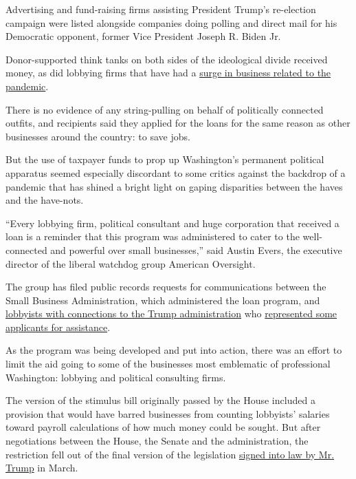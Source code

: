 Advertising and fund-raising firms assisting President Trump's
re-election campaign were listed alongside companies doing polling and
direct mail for his Democratic opponent, former Vice President Joseph R.
Biden Jr.

Donor-supported think tanks on both sides of the ideological divide
received money, as did lobbying firms that have had a
\href{https://www.nytimes.com/2020/03/20/us/politics/coronavirus-stimulus-lobbying.html}{surge
in business related to the pandemic}.

There is no evidence of any string-pulling on behalf of politically
connected outfits, and recipients said they applied for the loans for
the same reason as other businesses around the country: to save jobs.

But the use of taxpayer funds to prop up Washington's permanent
political apparatus seemed especially discordant to some critics against
the backdrop of a pandemic that has shined a bright light on gaping
disparities between the haves and the have-nots.

``Every lobbying firm, political consultant and huge corporation that
received a loan is a reminder that this program was administered to
cater to the well-connected and powerful over small businesses,'' said
Austin Evers, the executive director of the liberal watchdog group
American Oversight.

The group has filed public records requests for communications between
the Small Business Administration, which administered the loan program,
and
\href{https://www.nytimes.com/2020/07/06/us/politics/trump-lobbyists-swamp-campaign.html}{lobbyists
with connections to the Trump administration} who
\href{https://www.nytimes.com/2020/05/01/business/economy/monty-bennett-small-business-loans-coronavirus.html}{represented
some applicants for assistance}.

As the program was being developed and put into action, there was an
effort to limit the aid going to some of the businesses most emblematic
of professional Washington: lobbying and political consulting firms.

The version of the stimulus bill originally passed by the House included
a provision that would have barred businesses from counting lobbyists'
salaries toward payroll calculations of how much money could be sought.
But after negotiations between the House, the Senate and the
administration, the restriction fell out of the final version of the
legislation
\href{https://www.nytimes.com/video/us/politics/100000007059089/trump-coronavirus-stimulus.html}{signed
into law by Mr. Trump} in March.

